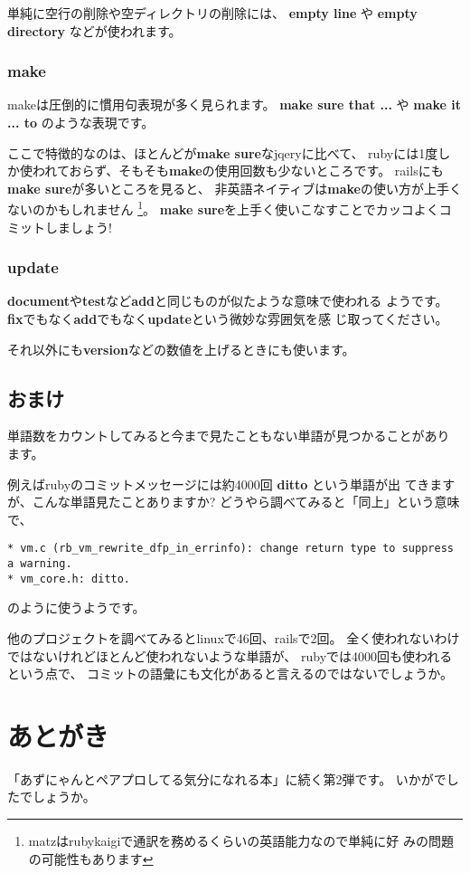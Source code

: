 \documentclass{jarticle}
\begin{document}
   単純に空行の削除や空ディレクトリの削除には、
   {\bf empty line} や {\bf empty directory} などが使われます。

   \subsubsection{make}
   makeは圧倒的に慣用句表現が多く見られます。
   {\bf make sure that ...} や {\bf make it ... to} のような表現です。

   ここで特徴的なのは、ほとんどが{\bf make sure}なjqeryに比べて、
   rubyには1度しか使われておらず、そもそも{\bf make}の使用回数も少ないところです。
   railsにも{\bf make sure}が多いところを見ると、
   非英語ネイティブは{\bf make}の使い方が上手くないのかもしれません
   \footnote{matzはrubykaigiで通訳を務めるくらいの英語能力なので単純に好
   みの問題の可能性もあります}。
   {\bf make sure}を上手く使いこなすことでカッコよくコミットしましょう!

   \subsubsection{update}
   {\bf document}や{\bf test}など{\bf add}と同じものが似たような意味で使われる
   ようです。
   {\bf fix}でもなく{\bf add}でもなく{\bf update}という微妙な雰囲気を感
   じ取ってください。

   それ以外にも{\bf version}などの数値を上げるときにも使います。

  \subsection{おまけ}
  単語数をカウントしてみると今まで見たこともない単語が見つかることがあり
  ます。

  例えばrubyのコミットメッセージには約4000回 {\bf ditto} という単語が出
  てきますが、こんな単語見たことありますか?
  どうやら調べてみると「同上」という意味で、
\begin{verbatim}
* vm.c (rb_vm_rewrite_dfp_in_errinfo): change return type to suppress a warning.
* vm_core.h: ditto.
\end{verbatim}
  のように使うようです。

  他のプロジェクトを調べてみるとlinuxで46回、railsで2回。
  全く使われないわけではないけれどほとんど使われないような単語が、
  rubyでは4000回も使われるという点で、
  コミットの語彙にも文化があると言えるのではないでしょうか。

  \newpage
   \section*{あとがき}
  「あずにゃんとペアプロしてる気分になれる本」に続く第2弾です。
  いかがでしたでしょうか。
\end{document}
